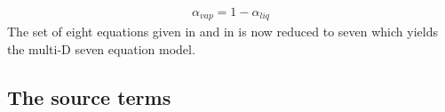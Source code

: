 %
\begin{align}
 \alpha_{vap}= 1 - \alpha_{liq}
\end{align}
%
The set of eight equations given in  and in  is now reduced to seven which yields the multi-D seven equation model.
\subsection{The source terms}\label{sec:source-terms-7-eqt-sect5}
